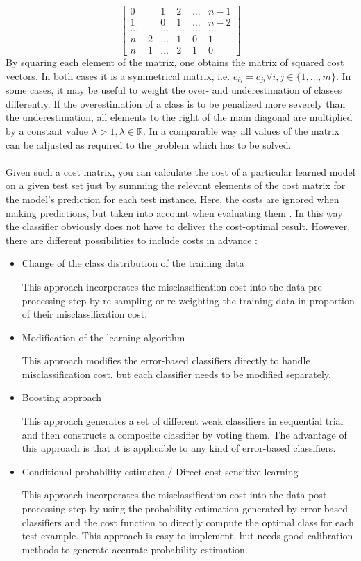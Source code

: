 \documentclass[article,type=msc,colorback,accentcolor=tud7b]{tudthesis}
\begin{document}
    \[\left[ \begin{array}{ccccc}
    {0} & {1} & {2} & {\dots} & {n-1} \\
    {1} & {0} & {1} & {\dots} & {n-2} \\
    {\dots} & {\dots} & {\dots} & {\dots} & {\dots} \\
    {n-2} & {\dots} & {1} & {0} & {1} \\
    {n-1} & {\dots} & {2} & {1} & {0}
    \end{array}\right]\]
    By squaring each element of the matrix, one obtains the matrix of squared cost vectors. In both cases it is a symmetrical matrix, i.e. $c_{ij}=c_{ji}\forall i,j\in\{1, \dots, m\}$. In some cases, it may be useful to weight the over- and underestimation of classes differently. If the overestimation of a class is to be penalized more severely than the underestimation, all elements to the right of the main diagonal are multiplied by a constant value $\lambda>1,\lambda\in\mathbb{R}$. In a comparable way all values of the matrix can be adjusted as required to the problem which has to be solved. \\\\
    Given such a cost matrix, you can calculate the cost of a particular learned model on a given test set just by summing the relevant elements of the cost matrix for the model’s prediction for each test instance. Here, the costs are ignored when making predictions, but taken into account when evaluating them \autocite[Chapter~5.7]{Witten2005}. In this way the classifier obviously does not have to deliver the cost-optimal result. However, there are different possibilities to include costs in advance \autocite[Chapter~2.3]{Qin2010}:
    \begin{itemize}
      \item Change of the class distribution of the training data
        
        This approach incorporates the misclassification cost into the data pre-processing step by re-sampling or re-weighting the training data in proportion of their misclassification cost.
      \item Modification of the learning algorithm
        
        This approach modifies the error-based classifiers directly to handle misclassification cost, but each classifier needs to be modified separately.
      \item Boosting approach
        
        This approach generates a set of different weak classifiers in sequential trial and then constructs a composite classifier by voting them. The advantage of this approach is that it is applicable to any kind of error-based classifiers.
      \item Conditional probability estimates / Direct cost-sensitive learning
        
        This approach incorporates the misclassification cost into the data post-processing step by using the probability estimation generated by error-based classifiers and the cost function to directly compute the optimal class for each test example. This approach is easy to implement, but needs good calibration methods to generate accurate probability estimation.
    \end{itemize}
\end{document}
